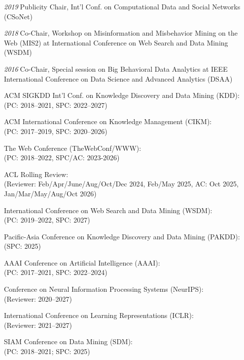\documentclass[10pt]{article}
\newenvironment{myindentpar}[1]%
{\begin{list}{}%
         {\setlength{\leftmargin}{#1}}%
         \item[]%
}
{\end{list}}
\newcounter{list}
\begin{document}
\begin{myindentpar}{0.75cm}
{\hspace{-0.75cm}\textit{2019}\textcolor{white}{.}Publicity Chair, Int'l Conf. on Computational Data and Social Networks (CSoNet)

\hspace{-0.75cm}\textit{2018}\textcolor{white}{.}Co-Chair, Workshop on Misinformation and Misbehavior Mining on the Web (MIS2) at International Conference on Web Search and Data Mining (WSDM)

\hspace{-0.75cm}\textit{2016}\textcolor{white}{.}Co-Chair, Special session on Big Behavioral Data Analytics at IEEE International Conference on Data Science and Advanced Analytics (DSAA)

}

\hspace{-0.75cm}{\bf (Senior) Program Committee / Reviewer}

{\small

ACM SIGKDD Int'l Conf. on Knowledge Discovery and Data Mining (KDD): \\
(PC: 2018--2021, SPC: 2022--2027)

ACM International Conference on Knowledge Management (CIKM): \\
(PC: 2017--2019, SPC: 2020--2026)

The Web Conference (TheWebConf/WWW): \\
(PC: 2018--2022, SPC/AC: 2023-2026)

ACL Rolling Review: \\
(Reviewer: Feb/Apr/June/Aug/Oct/Dec 2024, Feb/May 2025, AC: Oct 2025, Jan/Mar/May/Aug/Oct 2026)

International Conference on Web Search and Data Mining (WSDM): \\
(PC: 2019--2022, SPC: 2027)

Pacific-Asia Conference on Knowledge Discovery and Data Mining (PAKDD): \\
(SPC: 2025)

AAAI Conference on Artificial Intelligence (AAAI): \\
(PC: 2017--2021, SPC: 2022--2024)

Conference on Neural Information Processing Systems (NeurIPS): \\
(Reviewer: 2020--2027)

International Conference on Learning Representations (ICLR): \\
(Reviewer: 2021--2027)

SIAM Conference on Data Mining (SDM): \\
(PC: 2018--2021; SPC: 2025)

}
\end{myindentpar}
\end{document}
